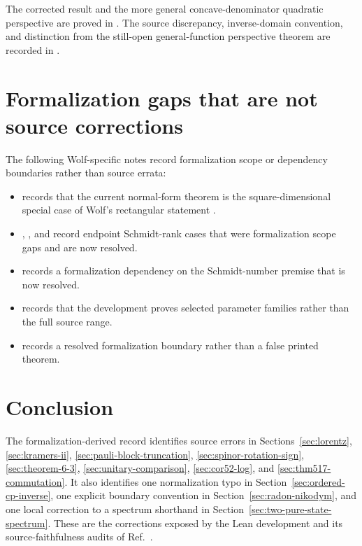 \documentclass{article}
\begin{document}
The corrected result and the more general concave-denominator quadratic
perspective are proved in .
The source discrepancy, inverse-domain convention, and distinction from the
still-open general-function perspective theorem are recorded in
.

\section{Formalization gaps that are not source corrections}

The following Wolf-specific notes record formalization scope or dependency
boundaries rather than source errata:
\begin{itemize}
    \item {} records that the current
          normal-form theorem is the square-dimensional special case of
          Wolf's rectangular statement \cite{Wolf2012Quantum}.
    \item {},
          , and
           record endpoint Schmidt-rank
          cases that were formalization scope gaps and are now resolved.
    \item {} records a
          formalization dependency on the Schmidt-number premise that is now
          resolved.
    \item {} records that the
          development proves selected parameter families rather than the full
          source range.
    \item {} records a resolved
          formalization boundary rather than a false printed theorem.
\end{itemize}

\section{Conclusion}

The formalization-derived record identifies source errors in
Sections~\ref{sec:lorentz}, \ref{sec:kramers-ii},
\ref{sec:pauli-block-truncation}, \ref{sec:spinor-rotation-sign},
\ref{sec:theorem-6-3}, \ref{sec:unitary-comparison},
\ref{sec:cor52-log}, and \ref{sec:thm517-commutation}. It also identifies one normalization typo in
Section~\ref{sec:ordered-cp-inverse}, one explicit boundary convention in
Section~\ref{sec:radon-nikodym}, and one local correction to a spectrum
shorthand in Section~\ref{sec:two-pure-state-spectrum}. These are the
corrections exposed by the Lean development and its source-faithfulness audits
of Ref.~\cite{Wolf2012Quantum}.
\end{document}
